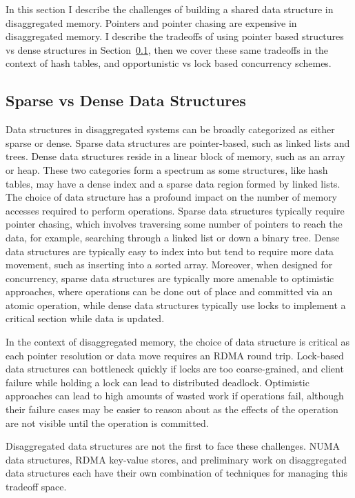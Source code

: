 \documentclass[12pt]{ucsddissertation}
\begin{document}
In this section I describe the challenges of building a shared data structure in disaggregated
memory. Pointers and pointer chasing are expensive in disaggregated memory. I describe the tradeoffs
of using pointer based structures vs dense structures in Section~\ref{sec:sparse-dense}, then we
cover these same tradeoffs in the context of hash tables, and opportunistic vs lock based
concurrency schemes.


\subsection{Sparse vs Dense Data Structures}
\label{sec:sparse-dense}


Data structures in disaggregated systems can be broadly categorized as either sparse or dense.
Sparse data structures are pointer-based, such as linked lists and trees. Dense data structures
reside in a linear block of memory, such as an array or heap. These two categories form a spectrum
as some structures, like hash tables, may have a dense index and a sparse data region formed by
linked lists. The choice of data structure has a profound impact on the number of memory accesses
required to perform operations. Sparse data structures typically require pointer chasing, which
involves traversing some number of pointers to reach the data, for example, searching through a
linked list or down a binary tree. Dense data structures are typically easy to index into but tend
to require more data movement, such as inserting into a sorted array. Moreover, when designed for
concurrency, sparse data structures are typically more amenable to optimistic approaches, where
operations can be done out of place and committed via an atomic operation, while dense data
structures typically use locks to implement a critical section while data is updated.

In the context of disaggregated memory, the choice of data structure is critical as each pointer
resolution or data move requires an RDMA round trip. Lock-based data structures can bottleneck
quickly if locks are too coarse-grained, and client failure while holding a lock can lead to
distributed deadlock. Optimistic approaches can lead to high amounts of wasted work if operations
fail, although their failure cases may be easier to reason about as the effects of the operation are
not visible until the operation is committed.

Disaggregated data structures are not the first to face these challenges. NUMA data structures, RDMA
key-value stores, and preliminary work on disaggregated data structures each have their own
combination of techniques for managing this tradeoff space.
\end{document}
